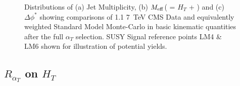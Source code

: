 \begin{figure}[htbp]
    \centering
     \newline

   
\caption{\label{fig:afterat}Distributions of (a) Jet Multiplicity, (b) $M_{\rm eff}$( = $H_{T}$ + \MHT) and (c) $\Delta \phi^{*}$ showing comparisons of 1.1  7~TeV CMS Data and equivalently weighted Standard Model Monte-Carlo in basic kinematic quantities after the full $\alpha_{T}$ selection. SUSY Signal reference points LM4 \& LM6 shown for illustration of potential yields.}
\end{figure}

\subsection{$R_{\alpha_{T}}$ on $H_{T}$}

